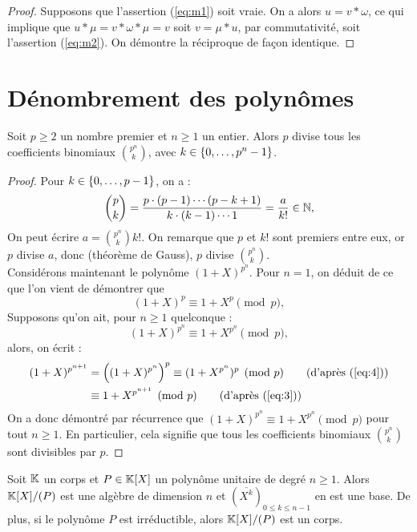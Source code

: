 \begin{proof}
Supposons que l'assertion (\ref{eq:m1}) soit vraie. On a alors $u = v \ast \omega$, ce qui implique que 
$u \ast \mu = v \ast \omega \ast \mu = v$ soit $v = \mu \ast u$, par commutativité, soit l'assertion (\ref{eq:m2}).
On démontre la réciproque de façon identique.
\end{proof}

\section{Dénombrement des polynômes}

\begin{lem}
\label{lem:divis}
Soit $p \geq 2$ un nombre premier et $n \geq 1$ un entier. 
Alors $p$ divise tous les coefficients binomiaux $\binom{p^n}{k}$, avec $k \in \{ 0, \dots, p^n-1 \}$.
\end{lem}

\begin{proof}
Pour $k \in \{ 0, \dots, p-1 \}$, on a :
\[ \binom{p}{k} = \dfrac{p \cdot (p-1) \cdots (p-k+1)}{k \cdot (k-1) \cdots 1} = \dfrac{a}{k!} \in \mathbb{N} , \]
On peut écrire $a = \binom{p^n}{k} k!$.
On remarque que $p$ et $k!$ sont premiers entre eux, or $p$ divise $a$, donc (théorème de Gauss), $p$ divise $\binom{p^n}{k}$. \\
Considérons maintenant le polynôme $(1+X)^{p^n}$. 
Pour $n=1$, on déduit de ce que l'on vient de démontrer que 
\begin{equation} (1+X)^p \equiv 1 + X^p \pmod p , \label{eq:3} \end{equation}
Supposons qu'on ait, pour $n \geq 1$ quelconque :
\begin{equation} (1+X)^{p^n} \equiv 1 + X^{p^n} \pmod p , \label{eq:4} \end{equation}
alors, on écrit :
\begin{align*}
(1+X)^{p^{n+1}} & = \left ( (1+X)^{p^n} \right )^p \equiv (1 + X^{p^n})^p \pmod p \qquad \text{(d'après (\ref{eq:4}))} \\
 & \equiv 1 + X^{p^{n+1}} \pmod p \qquad \text{(d'après (\ref{eq:3}))} 
\end{align*}
On a donc démontré par récurrence que $(1+X)^{p^n} \equiv 1 + X^{p^n} \pmod p$ pour tout $n \geq 1$.
En particulier, cela signifie que tous les coefficients binomiaux $\binom{p^n}{k}$ sont divisibles par $p$.
\end{proof}

\begin{thm}
\label{thm:structpoly}
Soit $\mathbb{K}$ un corps et $P \in \mathbb{K}[X]$ un polynôme unitaire de degré $n \geq 1$. 
Alors $\mathbb{K}[X]/(P)$ est une algèbre de dimension $n$ et $(\overline{X^k})_{0 \leq k \leq n-1}$ en est une base. 
De plus, si le polynôme $P$ est irréductible, alors $\mathbb{K}[X]/(P)$ est un corps.
\end{thm}

